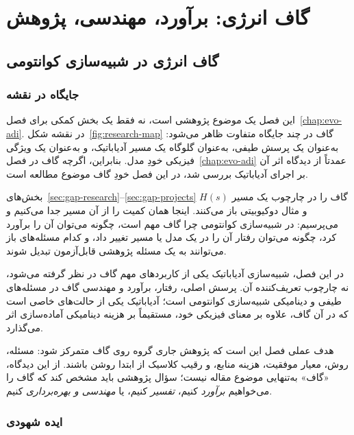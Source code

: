 \part{گاف انرژی: برآورد، مهندسی، پژوهش}

\chapter{گاف انرژی در شبیه‌سازی کوانتومی}
\label{chap:gap-energy}

\section{جایگاه در نقشه}

این فصل یک موضوع پژوهشی است، نه فقط یک بخش کمکی برای فصل~\ref{chap:evo-adi}.
در نقشه شکل~\ref{fig:research-map} گاف در چند جایگاه متفاوت ظاهر می‌شود: به‌عنوان یک پرسش طیفی، به‌عنوان گلوگاه یک مسیر آدیاباتیک، و به‌عنوان یک ویژگی فیزیکی خودِ مدل.
بنابراین، اگرچه گاف در فصل~\ref{chap:evo-adi} عمدتاً از دیدگاه اثر آن بر اجرای آدیاباتیک بررسی شد، در این فصل خودِ گاف موضوع مطالعه است.

بخش‌های~\ref{sec:gap-research}--\ref{sec:gap-projects} گاف را در چارچوب یک مسیر $H(s)$ و مثال دوکیوبیتی باز می‌کنند.
اینجا همان کمیت را از آن مسیر جدا می‌کنیم و می‌پرسیم: در شبیه‌سازی کوانتومی چرا گاف مهم است، چگونه می‌توان آن را برآورد کرد، چگونه می‌توان رفتار آن را در یک مدل یا مسیر تغییر داد، و کدام مسئله‌های باز می‌توانند به یک مسئله پژوهشی قابل‌آزمون تبدیل شوند.

در این فصل، شبیه‌سازی آدیاباتیک یکی از کاربردهای مهم گاف در نظر گرفته می‌شود، نه چارچوب تعریف‌کننده آن.
پرسش اصلی، رفتار، برآورد و مهندسی گاف در مسئله‌های طیفی و دینامیکی شبیه‌سازی کوانتومی است؛ آدیاباتیک یکی از حالت‌های خاصی است که در آن گاف، علاوه بر معنای فیزیکی خود، مستقیماً بر هزینه دینامیکی آماده‌سازی اثر می‌گذارد.

هدف عملی فصل این است که پژوهش جاری گروه روی گاف متمرکز شود: مسئله، روش، معیار موفقیت، هزینه منابع، و رقیب کلاسیک از ابتدا روشن باشند.
از این دیدگاه، «گاف» به‌تنهایی موضوع مقاله نیست؛ سؤال پژوهشی باید مشخص کند که گاف را می‌خواهیم \emph{برآورد} کنیم، \emph{تفسیر} کنیم، یا \emph{مهندسی و بهره‌برداری} کنیم.

\section{ایده شهودی}

